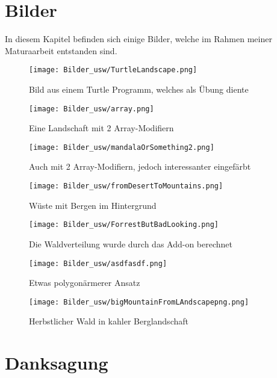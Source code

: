 \documentclass[12pt,twoside]{book}
\begin{document}
\chapter{Bilder}
In diesem Kapitel befinden sich einige Bilder, welche im Rahmen meiner Maturaarbeit entstanden sind.
\vspace{4cm}
\begin{figure}[H]
\centering
\texttt{[image: Bilder\_usw/TurtleLandscape.png]}
\caption{Bild aus einem Turtle Programm, welches als \"Ubung diente}
\label{}
\centering
\end{figure}


\begin{figure}[b]
\centering
\texttt{[image: Bilder\_usw/array.png]}
\centering
\caption{Eine Landschaft mit 2 Array-Modifiern}
\centering
\end{figure}

\begin{figure}[t]
\centering
\texttt{[image: Bilder\_usw/mandalaOrSomething2.png]}
\caption{Auch mit 2 Array-Modifiern, jedoch interessanter eingef\"arbt}
\label{}
\centering
\end{figure}


\begin{figure}[b]
\centering
\texttt{[image: Bilder\_usw/fromDesertToMountains.png]}
\caption{W\"uste mit Bergen im Hintergrund}
\label{}
\centering
\end{figure}

\begin{figure}[t]
\centering
\texttt{[image: Bilder\_usw/ForrestButBadLooking.png]}
\caption{Die Waldverteilung wurde durch das Add-on berechnet}
\label{}
\centering
\end{figure}

\begin{figure}[b]
\centering
\texttt{[image: Bilder\_usw/asdfasdf.png]}
\caption{Etwas polygon\"armerer Ansatz}
\label{}
\centering
\end{figure}

\begin{figure}[t]
\centering
\texttt{[image: Bilder\_usw/bigMountainFromLAndscapepng.png]}
\caption{Herbstlicher Wald in kahler Berglandschaft}
\label{}
\centering
\end{figure}


\chapter {Danksagung}
\end{document}
